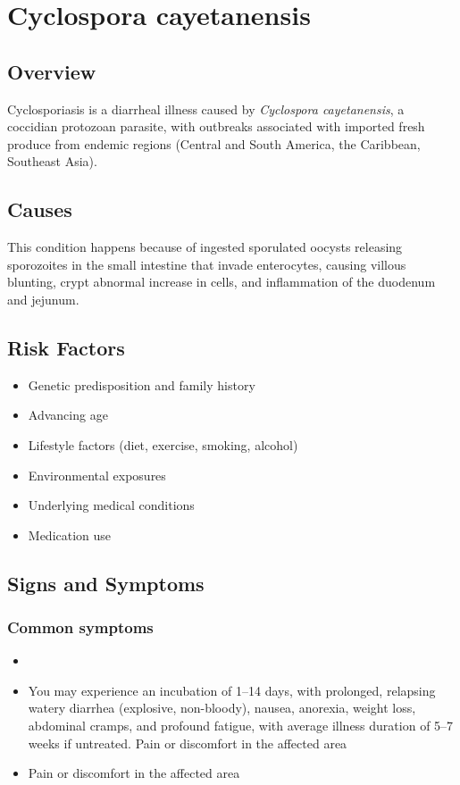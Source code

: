 \chapter{Cyclospora cayetanensis}
\label{sec:Cyclospora}

\section{Overview}
Cyclosporiasis is a diarrheal illness caused by \textit{Cyclospora cayetanensis}, a coccidian protozoan parasite, with outbreaks associated with imported fresh produce from endemic regions (Central and South America, the Caribbean, Southeast Asia).
\section{Causes}
This condition happens because of ingested sporulated oocysts releasing sporozoites in the small intestine that invade enterocytes, causing villous blunting, crypt abnormal increase in cells, and inflammation of the duodenum and jejunum.     
\section{Risk Factors}

\begin{itemize}[noitemsep]
  \item Genetic predisposition and family history
  \item Advancing age
  \item Lifestyle factors (diet, exercise, smoking, alcohol)
  \item Environmental exposures
  \item Underlying medical conditions
  \item Medication use
\end{itemize}
\section{Signs and Symptoms}

\subsection{Common symptoms}
\begin{itemize}[noitemsep]
  \item \item You may experience an incubation of 1--14 days, with prolonged, relapsing watery diarrhea (explosive, non-bloody), nausea, anorexia, weight loss, abdominal cramps, and profound fatigue, with average illness duration of 5--7 weeks if untreated. Pain or discomfort in the affected area    \item Pain or discomfort in the affected area
  \end{itemize}

